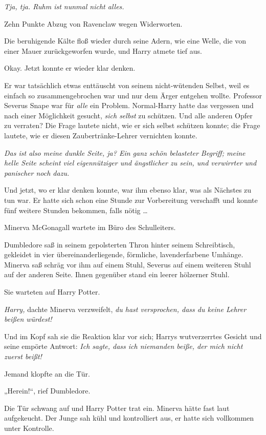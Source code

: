 {\emph{Tja, tja. Ruhm ist nunmal nicht alles.}

Zehn Punkte Abzug von Ravenclaw wegen Widerworten.

Die beruhigende Kälte floß wieder durch seine Adern, wie eine Welle, die von einer Mauer zurückgeworfen wurde, und Harry atmete tief aus.

Okay. Jetzt konnte er wieder klar denken.

Er war tatsächlich etwas enttäuscht von seinem nicht-wütenden Selbst, weil es einfach so zusammengebrochen war und nur dem Ärger entgehen wollte. Professor Severus Snape war für \emph{alle} ein Problem. Normal-Harry hatte das vergessen und nach einer Möglichkeit gesucht, \emph{sich selbst} zu schützen. Und alle anderen Opfer zu verraten? Die Frage lautete nicht, wie er sich selbst schützen konnte; die Frage lautete, wie er diesen Zaubertränke-Lehrer vernichten konnte.

\emph{Das ist also meine dunkle Seite, ja? Ein ganz schön belasteter Begriff; meine helle Seite scheint viel eigennütziger und ängstlicher zu sein, und verwirrter und panischer noch dazu.}

Und jetzt, wo er klar denken konnte, war ihm ebenso klar, was als Nächstes zu tun war. Er hatte sich schon eine Stunde zur Vorbereitung verschafft und konnte fünf weitere Stunden bekommen, falls nötig …

\later

Minerva McGonagall wartete im Büro des Schulleiters.

Dumbledore saß in seinem gepolsterten Thron hinter seinem Schreibtisch, gekleidet in vier übereinanderliegende, förmliche, lavenderfarbene Umhänge. Minerva saß schräg vor ihm auf einem Stuhl, Severus auf einem weiteren Stuhl auf der anderen Seite. Ihnen gegenüber stand ein leerer hölzerner Stuhl.

Sie warteten auf Harry Potter.

\emph{Harry,} dachte Minerva verzweifelt, \emph{du hast versprochen, dass du keine Lehrer beißen würdest!}

Und im Kopf sah sie die Reaktion klar vor sich; Harrys wutverzerrtes Gesicht und seine empörte Antwort: \emph{Ich sagte, dass ich niemanden beiße, der mich nicht zuerst beißt!}

Jemand klopfte an die Tür.

„Herein!“, rief Dumbledore.

Die Tür schwang auf und Harry Potter trat ein. Minerva hätte fast laut aufgekeucht. Der Junge sah kühl und kontrolliert aus, er hatte sich vollkommen unter Kontrolle.

}
